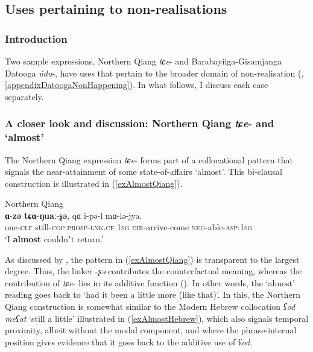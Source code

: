 \subsection{Uses pertaining to non-realisations}\label{sectionNearAttainment}
\subsubsection[tocentry={}]{Introduction}
Two sample expressions,  Northern Qiang \mbox{\textit{tɕe}-} and Barabayiiga-Gisamjanga Datooga \mbox{\textit{údu}-}, have uses that pertain to the broader domain of non-realisation (, \ref{appendixDatoogaNonHappening}). In what follows, I discuss each case separately.

\subsubsection[tocentry={}]{A closer look and discussion:  Northern Qiang \mbox{\textit{tɕe}-} and \lq almost\rq{}} The Northern Qiang expression \mbox{\textit{tɕe}-} forms part of a collocational pattern that signals the near-attainment of some state-of-affairs \lq almost\rq{}. This bi-clausal construction is illustrated in (\ref{exAlmostQiang}).

\begin{exe}
	\ex Northern Qiang\label{exAlmostQiang}\\
	\gll \textbf{ɑ}-\textbf{zə} \textbf{tɕɑ}-\textbf{ŋuaː}-\textbf{ʂə}, qɑ i-pə-l mɑ-lə-jya.\\
	one-\textsc{clf} still-\textsc{cop}.\textsc{prosp}-\textsc{lnk}.\textsc{cf} 1\textsc{sg} \textsc{dir}-arrive-come \textsc{neg}-able-\textsc{asp}:1\textsc{sg}\\
	\glt \lq I \textbf{almost} couldnʼt return.' \parencite[219]{LaPollaHuang2003}
\end{exe}

As discussed by \textcite[220]{LaPollaHuang2003}, the pattern in (\ref{exAlmostQiang}) is transparent to the largest degree. Thus, the linker \mbox{-\textit{ʂə}} contributes the counterfactual meaning, whereas the contribution of \mbox{\textit{tɕe}-} lies in its additive function (). In other words, the \lq almost\rq{ }reading goes back to \lq had it been a little more (like that)\rq{}. In this, the Northern Qiang construction is somewhat similar to the Modern Hebrew collocation \textit{ʕod meʕat} \lq still a little\rq{ }illustrated in (\ref{exAlmostHebrew}), which also signals temporal proximity, albeit without the modal component, and where the phrase-internal position gives evidence that it goes back to the additive use of \textit{ʕod}.\pagebreak

